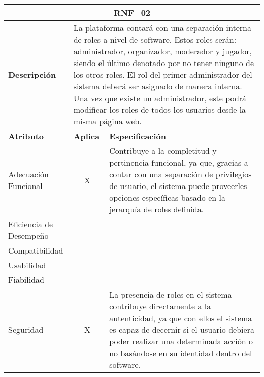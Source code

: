 \begin{center}
  \begin{tabular}{ | p{2cm}| p{8cm} | p{5cm} |}
    \hline
    \multicolumn{3}{|c|}{\textbf{RNF\_02}} \\
    \hline
    
    \multicolumn{1}{|p{2cm}|}{\textbf{Descripción}} & \multicolumn{2}{|p{13cm}|}{La plataforma contará con una separación interna de roles a nivel de software. Estos roles serán: administrador, organizador, moderador y jugador, siendo el último denotado por no tener ninguno de los otros roles. El rol del primer administrador del sistema deberá ser asignado de manera interna. Una vez que existe un administrador, este podrá modificar los roles de todos los usuarios desde la misma página web.} \\ \hline
    
    \multicolumn{1}{|p{3.5cm}|}{\textbf{{Atributo}}} & \multicolumn{1}{|p{1.5cm}|}{\textbf{Aplica}} & \multicolumn{1}{|p{10cm}|}{\textbf{Especificación}} \\ \hline
    
    \multicolumn{1}{|p{3.5cm}|}{\nohyphens{Adecuación Funcional}} & \multicolumn{1}{|c|}{X} & \multicolumn{1}{|p{10cm}|}{Contribuye a la completitud y pertinencia funcional, ya que, gracias a contar con una separación de privilegios de usuario, el sistema puede proveerles opciones específicas basado en la jerarquía de roles definida.} \\ \hline
    
    \multicolumn{1}{|p{3.5cm}|}{\nohyphens{Eficiencia de Desempeño}} & \multicolumn{1}{|c|}{} & \multicolumn{1}{|p{10cm}|}{} \\ \hline
    
    \multicolumn{1}{|p{3.5cm}|}{\nohyphens{Compatibilidad}} & \multicolumn{1}{|c|}{} & \multicolumn{1}{|p{10cm}|}{} \\ \hline
    
    \multicolumn{1}{|p{3.5cm}|}{\nohyphens{Usabilidad}} & \multicolumn{1}{|c|}{} & \multicolumn{1}{|p{10cm}|}{} \\ \hline
    
    \multicolumn{1}{|p{3.5cm}|}{\nohyphens{Fiabilidad}} & \multicolumn{1}{|c|}{} & \multicolumn{1}{|p{10cm}|}{} \\ \hline
    
    \multicolumn{1}{|p{3.5cm}|}{\nohyphens{Seguridad}} & \multicolumn{1}{|c|}{X} & \multicolumn{1}{|p{10cm}|}{La presencia de roles en el sistema contribuye directamente a la autenticidad, ya que con ellos el sistema es capaz de decernir si el usuario debiera poder realizar una determinada acción o no basándose en su identidad dentro del software.} \\ \hline
    

\end{tabular}
\end{center}
